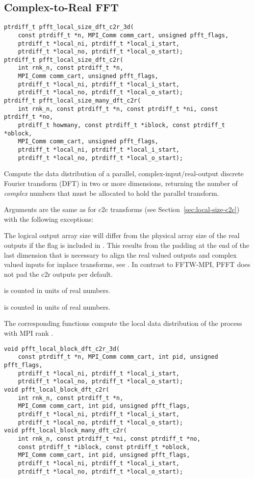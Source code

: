\subsection{Complex-to-Real FFT}\label{sec:local-size-c2r}
\begin{lstlisting}
ptrdiff_t pfft_local_size_dft_c2r_3d(
    const ptrdiff_t *n, MPI_Comm comm_cart, unsigned pfft_flags,
    ptrdiff_t *local_ni, ptrdiff_t *local_i_start,
    ptrdiff_t *local_no, ptrdiff_t *local_o_start);
ptrdiff_t pfft_local_size_dft_c2r(
    int rnk_n, const ptrdiff_t *n,
    MPI_Comm comm_cart, unsigned pfft_flags,
    ptrdiff_t *local_ni, ptrdiff_t *local_i_start,
    ptrdiff_t *local_no, ptrdiff_t *local_o_start);
ptrdiff_t pfft_local_size_many_dft_c2r(
    int rnk_n, const ptrdiff_t *n, const ptrdiff_t *ni, const ptrdiff_t *no,
    ptrdiff_t howmany, const ptrdiff_t *iblock, const ptrdiff_t *oblock,
    MPI_Comm comm_cart, unsigned pfft_flags,
    ptrdiff_t *local_ni, ptrdiff_t *local_i_start,
    ptrdiff_t *local_no, ptrdiff_t *local_o_start);
\end{lstlisting}
Compute the data distribution of a parallel, complex-input/real-output discrete Fourier transform (DFT) in two or more dimensions,
returning the number of \emph{complex} numbers that must be allocated to hold the parallel transform.

Arguments are the same as for c2c transforms (see Section~\ref{sec:local-size-c2c}) with the following exceptions:
\begin{compactitem}
  \item The logical output array size  will differ from the physical array size of the real outputs if the flag 
        is included in . This results from the padding at the end of the last dimension that is necessary to
        align the real valued outputs and complex valued inputs for inplace transforms, see \cite{fftw-r2c-padding}.
        In contrast to FFTW-MPI, PFFT does not pad the c2r outputs per default.
  \item {} is counted in units of real numbers.
  \item {} is counted in units of real numbers.
\end{compactitem}

The corresponding  functions compute the local data distribution of the process with MPI rank .
\begin{lstlisting}
void pfft_local_block_dft_c2r_3d(
    const ptrdiff_t *n, MPI_Comm comm_cart, int pid, unsigned pfft_flags,
    ptrdiff_t *local_ni, ptrdiff_t *local_i_start,
    ptrdiff_t *local_no, ptrdiff_t *local_o_start);
void pfft_local_block_dft_c2r(
    int rnk_n, const ptrdiff_t *n,
    MPI_Comm comm_cart, int pid, unsigned pfft_flags,
    ptrdiff_t *local_ni, ptrdiff_t *local_i_start,
    ptrdiff_t *local_no, ptrdiff_t *local_o_start);
void pfft_local_block_many_dft_c2r(
    int rnk_n, const ptrdiff_t *ni, const ptrdiff_t *no,
    const ptrdiff_t *iblock, const ptrdiff_t *oblock,
    MPI_Comm comm_cart, int pid, unsigned pfft_flags,
    ptrdiff_t *local_ni, ptrdiff_t *local_i_start,
    ptrdiff_t *local_no, ptrdiff_t *local_o_start);
\end{lstlisting}

